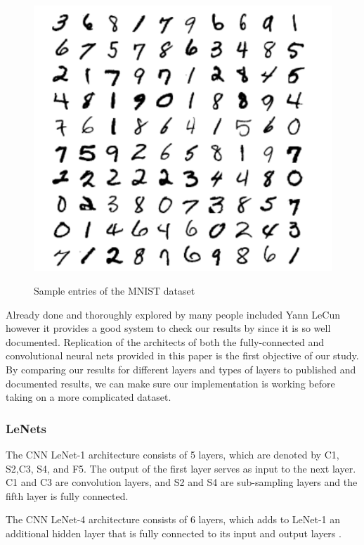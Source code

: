 \documentclass[12pt, twocolumn]{article}
\begin{document}
\begin{figure}
\includegraphics[scale=.8]{MNISTnos.png}
\label{fig:MNISTex}
\caption{Sample entries of the MNIST dataset \cite{LeCun1998}}
\end{figure}

Already done and thoroughly explored by many people included Yann LeCun \cite{LeCun1998} however it provides a good system to check our results by since it is so well documented.  Replication of the architects of both the fully-connected and convolutional neural nets provided in this paper is the first objective of our study. By comparing our results  for different layers and types of layers to published and documented results, we can make sure our implementation is working before taking on a more complicated dataset. 

\subsubsection{LeNets}
The CNN LeNet-1 architecture consists of 5 layers, which are denoted by C1, S2,C3, S4, and F5.  The output of the first layer serves as
input to the next layer. C1 and C3 are convolution layers, and S2 and S4 are sub-sampling layers and the fifth layer is fully connected. \cite{LeCun89}

The CNN LeNet-4 architecture consists of 6 layers, which adds to LeNet-1 an additional hidden layer that is fully connected to its  input and output layers . \cite{LeCun95}
\end{document}
